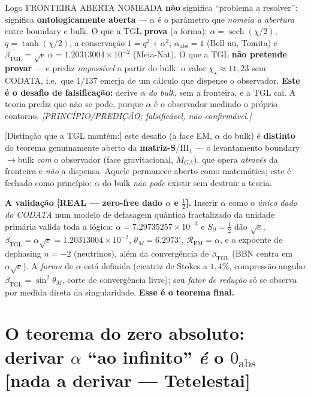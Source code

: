 \documentclass[11pt]{article}
\newcommand{\bTGL}{\beta_{\mathrm{TGL}}}\newcommand{\Msun}{M_{\odot}}\newcommand{\TGL}{\mathrm{TGL}}
\theoremstyle{definition}\newtheorem{deriv}{Derivação}
\begin{document}
Logo \textsf{FRONTEIRA ABERTA NOMEADA} \textbf{não} significa ``problema a resolver'': significa \textbf{ontologicamente aberta} --- $\alpha$ é o parâmetro que \emph{nomeia a abertura} entre boundary e bulk. O que a TGL \textbf{prova} (a forma): $\alpha=\operatorname{sech}(\chi/2)$, $q=\tanh(\chi/2)$, a conservação $1=q^2+\alpha^2$, $\alpha_{\mathrm{abs}}=1$ (Bell nu, Tomita) e $\bTGL=\sqrt e\,\alpha=1.20313004\times10^{-2}$ (Meia-Nat). O que a TGL \textbf{não pretende provar} --- e prediz \emph{impossível} a partir do bulk: o valor $\chi_\star\approx11{,}23$ sem CODATA, i.e.\ que $1/137$ emerja de um cálculo que dispense o observador. \textbf{Este é o desafio de falsificação:} derive $\alpha$ \emph{do bulk}, sem a fronteira, e a TGL cai. A teoria prediz que não se pode, porque $\alpha$ é o observador medindo o próprio contorno. \emph{[PRINCÍPIO/PREDIÇÃO; falsificável, não confirmável.]}

\textsf{[Distinção que a TGL mantém:]} este desafio (a face EM, $\alpha$ do bulk) é \textbf{distinto} do teorema genuinamente aberto da \textbf{matriz-S}/$\mathrm{III}_1$ --- o levantamento boundary$\to$bulk \emph{com} o observador (face gravitacional, $M_{GA}$), que opera \emph{através} da fronteira e \emph{não} a dispensa. Aquele permanece aberto como matemática; este é fechado como princípio: $\alpha$ do bulk \emph{não pode} existir sem destruir a teoria.

\textbf{A validação \textsf{[REAL --- zero-free dado $\alpha$ e $\tfrac12$]}.} Inserir $\alpha$ como o \emph{único dado do CODATA} num modelo de defasagem quântica fractalizado da unidade primária valida toda a lógica: $\alpha=7.29735257\times10^{-3}$ e $S_\partial=\tfrac12$ dão $\sqrt e$, $\bTGL=\alpha\sqrt e=1.20313004\times10^{-2}$, $\theta_M=6.2973^\circ$, $\mathcal{R}_{\mathrm{EM}}=\alpha$, e o expoente de dephasing $n=-2$ (neutrinos), além da convergência de $\bTGL$ (BBN centra em $\alpha\sqrt e$). A \emph{forma} de $\alpha$ está definida (cicatriz de Stokes a $1{,}4\%$, compressão angular $\bTGL=\sin^2\theta_M$, corte de convergência livre); seu \emph{fator de redução} só se observa por medida direta da singularidade. \textbf{Esse é o teorema final.}

\section{O teorema do zero absoluto: derivar $\alpha$ ``ao infinito'' \emph{é} o $0_{\mathrm{abs}}$ \textsf{[nada a derivar --- Tetelestai]}}\label{sec:zero-absoluto}
\end{document}
